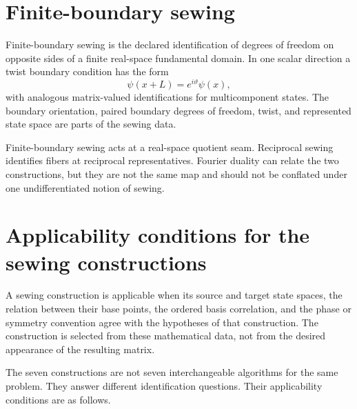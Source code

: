 \section{Finite-boundary sewing}

\begin{definition}
\label{def:training-finite-boundary-sewing}
Finite-boundary sewing is the declared identification of degrees of freedom on
opposite sides of a finite real-space fundamental domain. In one scalar
direction a twist boundary condition has the form
\begin{equation}
  \psi(x+L)=e^{i\vartheta}\psi(x),
  \label{eq:training-finite-boundary-twist}
\end{equation}
with analogous matrix-valued identifications for multicomponent states. The
boundary orientation, paired boundary degrees of freedom, twist, and represented
state space are parts of the sewing data.
\end{definition}

Finite-boundary sewing acts at a real-space quotient seam. Reciprocal sewing
identifies fibers at reciprocal representatives. Fourier duality can relate the
two constructions, but they are not the same map and should not be conflated
under one undifferentiated notion of sewing.

\section{Applicability conditions for the sewing constructions}

\begin{definition}
\label{def:training-sewing-applicability}
A sewing construction is applicable when its source and target state spaces,
the relation between their base points, the ordered basis correlation, and the
phase or symmetry convention agree with the hypotheses of that construction.
The construction is selected from these mathematical data, not from the desired
appearance of the resulting matrix.
\end{definition}

The seven constructions are not seven interchangeable algorithms for the same
problem. They answer different identification questions. Their applicability
conditions are as follows.

